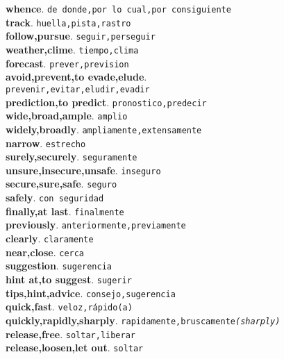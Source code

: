 \documentclass[twocolumn]{article}
\begin{document}
	\textsf{\textbf{whence}}. \texttt{de donde,por lo cual,por consiguiente}\\
	\textsf{\textbf{track}}. \texttt{huella,pista,rastro}\\
	\textsf{\textbf{follow,pursue}}. \texttt{seguir,perseguir}\\
	\textsf{\textbf{weather,clime}}. \texttt{tiempo,clima}\\
	\textsf{\textbf{forecast}}. \texttt{prever,prevision}\\
	\textsf{\textbf{avoid,prevent,to evade,elude}}.\\\texttt{prevenir,evitar,eludir,evadir}\\
	\textsf{\textbf{prediction,to predict}}. \texttt{pronostico,predecir}\\
	\textsf{\textbf{wide,broad,ample}}. \texttt{amplio}\\
	\textsf{\textbf{widely,broadly}}. \texttt{ampliamente,extensamente}\\
	\textsf{\textbf{narrow}}. \texttt{estrecho}\\
	\textsf{\textbf{surely,securely}}. \texttt{seguramente}\\
	\textsf{\textbf{unsure,insecure,unsafe}}. \texttt{inseguro}\\
	\textsf{\textbf{secure,sure,safe}}. \texttt{seguro}\\
	\textsf{\textbf{safely}}. \texttt{con seguridad}\\
	\textsf{\textbf{finally,at last}}. \texttt{finalmente}\\
	\textsf{\textbf{previously}}. \texttt{anteriormente,previamente}\\
	\textsf{\textbf{clearly}}. \texttt{claramente}\\
	\textsf{\textbf{near,close}}. \texttt{cerca}\\
	\textsf{\textbf{suggestion}}. \texttt{sugerencia}\\
	\textsf{\textbf{hint at,to suggest}}. \texttt{sugerir}\\
	\textsf{\textbf{tips,hint,advice}}. \texttt{consejo,sugerencia}\\
	\textsf{\textbf{quick,fast}}. \texttt{veloz,r\'apido(a)}\\
	\textsf{\textbf{quickly,rapidly,sharply}}. \texttt{rapidamente,bruscamente{\scriptsize \textsl{(sharply)}}}\\
	\textsf{\textbf{release,free}}. \texttt{soltar,liberar}\\
	\textsf{\textbf{release,loosen,let out}}. \texttt{soltar}\\
\end{document}
